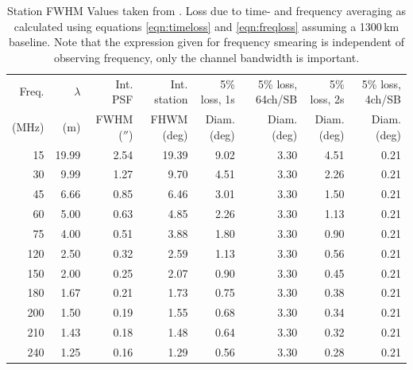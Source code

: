 \documentclass[graybox]{svmult}
\begin{document}
\begin{table}[h]
\centering
\begin{tabular}{rrrr|rr|rr}
\hline\hline
Freq. & $\lambda$ & Int. PSF & Int. station& 5\% loss, 1s& 5\% loss, 64ch/SB & 5\% loss, 2s& 5\% loss, 4ch/SB\\
(MHz) & (m) & FWHM ($''$) & FHWM (deg) & Diam. (deg) & Diam. (deg) & Diam. (deg) & Diam. (deg)\\
\hline
 15 & 19.99 & 2.54&19.39 & 9.02 & 3.30& 4.51 & 0.21\\
 30 & 9.99 & 1.27 & 9.70 & 4.51 & 3.30& 2.26 & 0.21\\
 45 & 6.66 & 0.85 & 6.46 & 3.01 & 3.30& 1.50 & 0.21\\
 60 & 5.00 & 0.63 & 4.85 & 2.26 & 3.30& 1.13 & 0.21\\
 75 & 4.00 & 0.51 & 3.88 & 1.80 & 3.30& 0.90 & 0.21\\
120 & 2.50 & 0.32 & 2.59 & 1.13 & 3.30& 0.56 & 0.21\\
150 & 2.00 & 0.25 & 2.07 & 0.90 & 3.30& 0.45 & 0.21\\
180 & 1.67 & 0.21 & 1.73 & 0.75 & 3.30& 0.38 & 0.21\\
200 & 1.50 & 0.19 & 1.55 & 0.68 & 3.30& 0.34 & 0.21\\
210 & 1.43 & 0.18 & 1.48 & 0.64 & 3.30& 0.32 & 0.21\\
240 & 1.25 & 0.16 & 1.29 & 0.56 & 3.30& 0.28 & 0.21\\

\hline
\end{tabular}
\caption{Station FWHM Values taken from \cite[App. B]{vanhaarlem13}. Loss due
to time- and frequency averaging as calculated using equations 
\ref{eqn:timeloss} and \ref{eqn:freqloss} assuming a 1300\,km baseline. Note that the expression
given for frequency smearing is independent of observing frequency, only the
channel bandwidth is important. 
\label{tab:res}}
\end{table}


%
%
\end{document}
